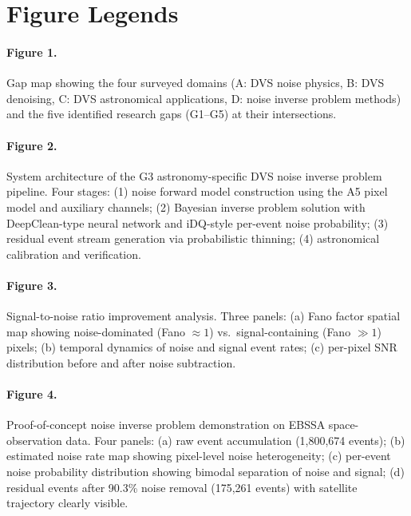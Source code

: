 \documentclass[12pt]{article}
\begin{document}
\newpage
\section*{Figure Legends}

\paragraph{Figure 1.}
Gap map showing the four surveyed domains (A: DVS noise physics, B: DVS denoising, C: DVS astronomical applications, D: noise inverse problem methods) and the five identified research gaps (G1--G5) at their intersections.
\label{fig:gapmap}

\paragraph{Figure 2.}
System architecture of the G3 astronomy-specific DVS noise inverse problem pipeline.
Four stages: (1) noise forward model construction using the A5 pixel model and auxiliary channels; (2) Bayesian inverse problem solution with DeepClean-type neural network and iDQ-style per-event noise probability; (3) residual event stream generation via probabilistic thinning; (4) astronomical calibration and verification.
\label{fig:pipeline}

\paragraph{Figure 3.}
Signal-to-noise ratio improvement analysis.
Three panels: (a) Fano factor spatial map showing noise-dominated (Fano $\approx 1$) vs.\ signal-containing (Fano $\gg 1$) pixels; (b) temporal dynamics of noise and signal event rates; (c) per-pixel SNR distribution before and after noise subtraction.
\label{fig:demo_snr}

\paragraph{Figure 4.}
Proof-of-concept noise inverse problem demonstration on EBSSA space-observation data.
Four panels: (a) raw event accumulation (1,800,674 events); (b) estimated noise rate map showing pixel-level noise heterogeneity; (c) per-event noise probability distribution showing bimodal separation of noise and signal; (d) residual events after 90.3\% noise removal (175,261 events) with satellite trajectory clearly visible.
\label{fig:demo_result}
\end{document}
